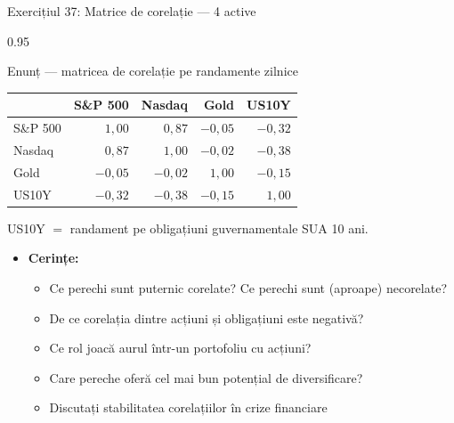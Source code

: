 \documentclass[9pt, aspectratio=169, t]{beamer}
\begin{document}
\begin{frame}[shrink=25]{Exercițiul 37: Matrice de corelație --- 4 active}
\begin{cminipage}{0.95\textwidth}
\begin{block}{Enunț --- matricea de corelație pe randamente zilnice}
\small
\renewcommand{\arraystretch}{1.2}
\begin{center}
\begin{tabular}{lrrrr}
\toprule
& \textbf{S\&P 500} & \textbf{Nasdaq} & \textbf{Gold} & \textbf{US10Y} \\
\midrule
S\&P 500 & $1{,}00$ & $0{,}87$ & $-0{,}05$ & $-0{,}32$ \\
Nasdaq   & $0{,}87$ & $1{,}00$ & $-0{,}02$ & $-0{,}38$ \\
Gold     & $-0{,}05$ & $-0{,}02$ & $1{,}00$ & $-0{,}15$ \\
US10Y    & $-0{,}32$ & $-0{,}38$ & $-0{,}15$ & $1{,}00$ \\
\bottomrule
\end{tabular}
\end{center}
US10Y $=$ randament pe obligațiuni guvernamentale SUA 10 ani.
\end{block}
\begin{itemize}\setlength{\itemsep}{0pt}
    \item \textbf{Cerințe:}
    \begin{itemize}\setlength{\itemsep}{0pt}
        \item Ce perechi sunt puternic corelate? Ce perechi sunt (aproape) necorelate?
        \item De ce corelația dintre acțiuni și obligațiuni este negativă?
        \item Ce rol joacă aurul într-un portofoliu cu acțiuni?
        \item Care pereche oferă cel mai bun potențial de diversificare?
        \item Discutați stabilitatea corelațiilor în crize financiare
    \end{itemize}
\end{itemize}
\end{cminipage}
\end{frame}
\end{document}
